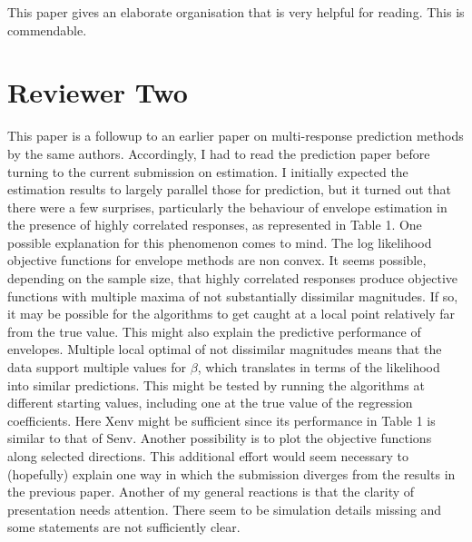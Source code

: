 \documentclass[11pt, a4paper]{article}
\begin{document}
This paper gives an elaborate organisation that is very helpful for reading. This is commendable.

\clearpage

\section{Reviewer Two}

This paper is a followup to an earlier paper on multi-response prediction
methods by the same authors. Accordingly, I had to read the prediction paper
before turning to the current submission on estimation. I initially expected the
estimation results to largely parallel those for prediction, but it turned out
that there were a few surprises, particularly the behaviour of envelope
estimation in the presence of highly correlated responses, as represented in
Table 1.  One possible explanation for this phenomenon comes to mind. The log likelihood objective functions for envelope methods are non convex. It seems possible, depending on the sample size, that highly correlated responses produce objective functions with multiple maxima of not substantially dissimilar magnitudes.  
If so, it may be possible for the algorithms to get caught at a local point
relatively far from the true value. This might also explain the predictive
performance of envelopes. Multiple local optimal of not dissimilar magnitudes
means that the data support multiple values for $\beta$, which translates in terms
of the likelihood into similar predictions. This might be tested by running the
algorithms at different starting values, including one at the true value of the
regression coefficients.  Here Xenv might be sufficient since its performance in Table 1 is similar to that of Senv. Another possibility is to plot the objective functions along selected directions. This additional effort would seem necessary to (hopefully) explain one way in which the submission diverges from the results in the previous paper. Another of my general reactions is that the clarity of presentation needs attention. There seem to be simulation details missing and some statements are not sufficiently clear.
\end{document}
